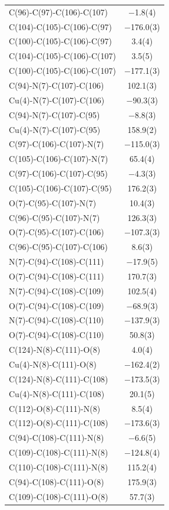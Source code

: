 \begin{center}
{\begin{supertabular}{p{1.8in}c}
C(96)-C(97)-C(106)-C(107)&$-$1.8(4)\\
C(104)-C(105)-C(106)-C(97)&$-$176.0(3)\\
C(100)-C(105)-C(106)-C(97)&3.4(4)\\
C(104)-C(105)-C(106)-C(107)&3.5(5)\\
C(100)-C(105)-C(106)-C(107)&$-$177.1(3)\\
C(94)-N(7)-C(107)-C(106)&102.1(3)\\
Cu(4)-N(7)-C(107)-C(106)&$-$90.3(3)\\
C(94)-N(7)-C(107)-C(95)&$-$8.8(3)\\
Cu(4)-N(7)-C(107)-C(95)&158.9(2)\\
C(97)-C(106)-C(107)-N(7)&$-$115.0(3)\\
C(105)-C(106)-C(107)-N(7)&65.4(4)\\
C(97)-C(106)-C(107)-C(95)&$-$4.3(3)\\
C(105)-C(106)-C(107)-C(95)&176.2(3)\\
O(7)-C(95)-C(107)-N(7)&10.4(3)\\
C(96)-C(95)-C(107)-N(7)&126.3(3)\\
O(7)-C(95)-C(107)-C(106)&$-$107.3(3)\\
C(96)-C(95)-C(107)-C(106)&8.6(3)\\
N(7)-C(94)-C(108)-C(111)&$-$17.9(5)\\
O(7)-C(94)-C(108)-C(111)&170.7(3)\\
N(7)-C(94)-C(108)-C(109)&102.5(4)\\
O(7)-C(94)-C(108)-C(109)&$-$68.9(3)\\
N(7)-C(94)-C(108)-C(110)&$-$137.9(3)\\
O(7)-C(94)-C(108)-C(110)&50.8(3)\\
C(124)-N(8)-C(111)-O(8)&4.0(4)\\
Cu(4)-N(8)-C(111)-O(8)&$-$162.4(2)\\
C(124)-N(8)-C(111)-C(108)&$-$173.5(3)\\
Cu(4)-N(8)-C(111)-C(108)&20.1(5)\\
C(112)-O(8)-C(111)-N(8)&8.5(4)\\
C(112)-O(8)-C(111)-C(108)&$-$173.6(3)\\
C(94)-C(108)-C(111)-N(8)&$-$6.6(5)\\
C(109)-C(108)-C(111)-N(8)&$-$124.8(4)\\
C(110)-C(108)-C(111)-N(8)&115.2(4)\\
C(94)-C(108)-C(111)-O(8)&175.9(3)\\
C(109)-C(108)-C(111)-O(8)&57.7(3)\\

\end{supertabular}}
\end{center}
